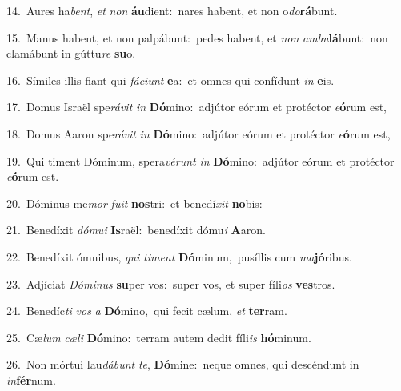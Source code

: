 {\numbfont\textcolor{\numbcolor}{14.}}~Aures ha\-\textit{bent}\-, \textit{et} \textit{non} \textbf{áu}\-dient:~\star nares habent, et non o\-\textit{do}\-\textbf{rá}bunt.\par
{\numbfont\textcolor{\numbcolor}{15.}}~Manus habent, et non palpábunt:~\dagger pedes habent, et \textit{non} \textit{am}\-\textit{bu}\textbf{lá}bunt:~\star non clamábunt in gúttu\textit{re} \textbf{su}\-o.\par
{\numbfont\textcolor{\numbcolor}{16.}}~Símiles illis fiant qui \textit{fá}\-\textit{ci}\textit{unt} \textbf{e}\-a:~\star et omnes qui confídunt \textit{in} \textbf{e}\-is.\par
{\numbfont\textcolor{\numbcolor}{17.}}~Domus Israël spe\-\textit{rá}\-\textit{vit} \textit{in} \textbf{Dó}\-mino:~\star adjútor eórum et protéctor \textit{e}\-\textbf{ó}rum est,\par
{\numbfont\textcolor{\numbcolor}{18.}}~Domus Aaron spe\-\textit{rá}\-\textit{vit} \textit{in} \textbf{Dó}\-mino:~\star adjútor eórum et protéctor \textit{e}\-\textbf{ó}rum est,\par
{\numbfont\textcolor{\numbcolor}{19.}}~Qui timent Dóminum, spera\-\textit{vé}\-\textit{runt} \textit{in} \textbf{Dó}\-mino:~\star adjútor eórum et protéctor \textit{e}\-\textbf{ó}rum est.\par
{\numbfont\textcolor{\numbcolor}{20.}}~Dóminus me\textit{mor} \textit{fu}\-\textit{it} \textbf{nos}\-tri:~\star et benedí\textit{xit} \textbf{no}\-bis:\par
{\numbfont\textcolor{\numbcolor}{21.}}~Benedíxit \textit{dó}\-\textit{mu}\textit{i} \textbf{Is}\-raël:~\star benedíxit dómu\textit{i} \textbf{A}\-aron.\par
{\numbfont\textcolor{\numbcolor}{22.}}~Benedíxit ómnibus, \textit{qui} \textit{ti}\-\textit{ment} \textbf{Dó}\-minum,~\star pusíllis cum \textit{ma}\-\textbf{jó}ribus.\par
{\numbfont\textcolor{\numbcolor}{23.}}~Adjíciat \textit{Dó}\-\textit{mi}\textit{nus} \textbf{su}\-per vos:~\star super vos, et super fíli\textit{os} \textbf{ves}\-tros.\par
{\numbfont\textcolor{\numbcolor}{24.}}~Benedíc\textit{ti} \textit{vos} \textit{a} \textbf{Dó}\-mino,~\star qui fecit cælum, \textit{et} \textbf{ter}\-ram.\par
{\numbfont\textcolor{\numbcolor}{25.}}~Cæ\textit{lum} \textit{cæ}\-\textit{li} \textbf{Dó}\-mino:~\star terram autem dedit fíli\textit{is} \textbf{hó}\-minum.\par
{\numbfont\textcolor{\numbcolor}{26.}}~Non mórtui lau\-\textit{dá}\-\textit{bunt} \textit{te}\-, \textbf{Dó}\-mine:~\star neque omnes, qui descéndunt in \textit{in}\-\textbf{fér}num.\par
